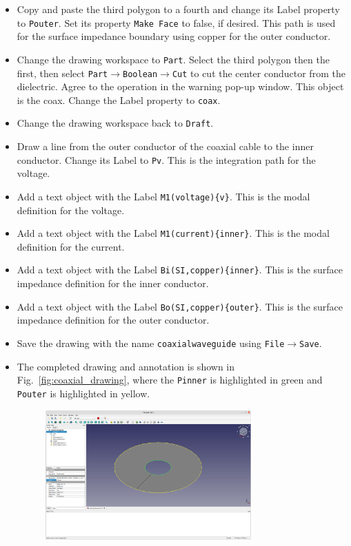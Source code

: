 \documentclass[titlepage]{article}
\renewcommand\_{\textunderscore\linebreak[1]}
\begin{document}
\begin{itemize}
\item Copy and paste the third polygon to a fourth and change its Label property to \texttt{\_Pouter}.  Set its property \texttt{Make Face} to false, if desired.  This path is used for the surface impedance boundary using copper for the outer conductor.
\item Change the drawing workspace to \texttt{Part}.  Select the third polygon then the first, then select \newline\texttt{Part}$\rightarrow$\texttt{Boolean}$\rightarrow$\texttt{Cut} to cut the center conductor from the dielectric.  Agree to the operation in the warning pop-up window.  This object is the coax.  Change the Label property to \texttt{coax}.
\item Change the drawing workspace back to \texttt{Draft}.
\item Draw a line from the outer conductor of the coaxial cable to the inner conductor.  Change its Label to \newline\texttt{\_Pv}.  This is the integration path for the voltage.
\item Add a text object with the Label \texttt{\_M1(voltage)\{v\}}.  This is the modal definition for the voltage.
\item Add a text object with the Label \texttt{\_M1(current)\{inner\}}.  This is the modal definition for the current.
\item Add a text object with the Label \texttt{\_Bi(SI,copper)\{inner\}}.  This is the surface impedance definition for the inner conductor.
\item Add a text object with the Label \texttt{\_Bo(SI,copper)\{outer\}}.  This is the surface impedance definition for the outer conductor.
\item Save the drawing with the name \texttt{coaxial\_waveguide} using \texttt{File}$\rightarrow$\texttt{Save}.
\item The completed drawing and annotation is shown in Fig.~\ref{fig:coaxial_drawing}, where the \texttt{\_Pinner} is highlighted in green and \texttt{\_Pouter} is highlighted in yellow.
\begin{figure}
  \centering
  \includegraphics[width=0.75\textwidth]{../tutorials/OpenParEM2D/coaxial_waveguide/screenshots/coaxial_drawing}

\end{figure}
\end{itemize}
\end{document}
